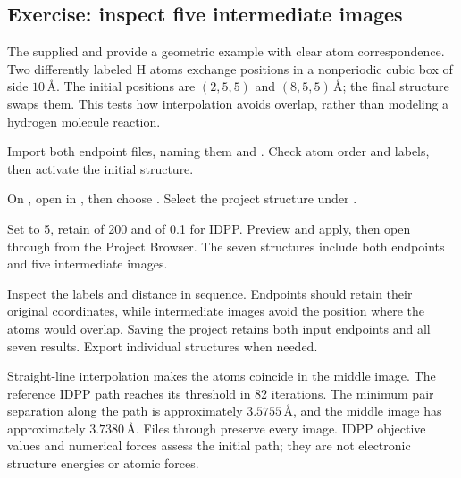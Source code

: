 

\subsection{Exercise: inspect five intermediate images}

The supplied  and  provide a geometric example with clear atom correspondence. Two differently labeled H atoms exchange positions in a nonperiodic cubic box of side $10\,\text{\AA}$. The initial positions are $(2,5,5)$ and $(8,5,5)\,\text{\AA}$; the final structure swaps them. This tests how interpolation avoids overlap, rather than modeling a hydrogen molecule reaction.

\begin{steps}
  \item Import both endpoint files, naming them  and . Check atom order and labels, then activate the initial structure.
  \item On , open  in , then choose . Select the project structure  under .
  \item Set  to 5, retain  of 200 and  of 0.1 for IDPP. Preview and apply, then open  through  from the Project Browser. The seven structures include both endpoints and five intermediate images.
  \item Inspect the labels and distance in sequence. Endpoints should retain their original coordinates, while intermediate images avoid the position where the atoms would overlap. Saving the project retains both input endpoints and all seven results. Export individual structures when needed.
\end{steps}

Straight-line interpolation makes the atoms coincide in the middle image. The reference IDPP path reaches its threshold in 82 iterations. The minimum pair separation along the path is approximately $3.5755\,\text{\AA}$, and the middle image has approximately $3.7380\,\text{\AA}$. Files  through  preserve every image. IDPP objective values and numerical forces assess the initial path; they are not electronic structure energies or atomic forces.

